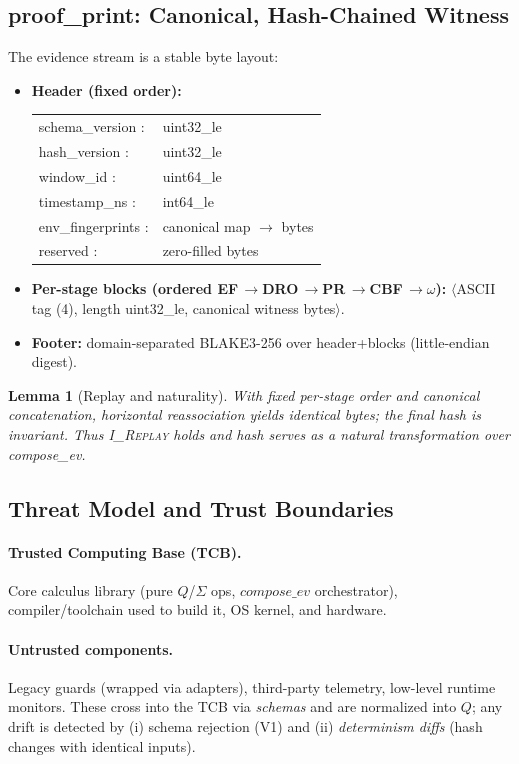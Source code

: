 \documentclass[11pt]{article}
\theoremstyle{plain}
\newtheorem{lemma}[theorem]{Lemma}
\theoremstyle{definition}
\theoremstyle{remark}
\def\Q{Q}%
\def\Sig{\Sigma}%
\def\composeev{compose\_ev}%
\def\code#1{#1}%
\DeclareRobustCommand{\Q}{\texorpdfstring{\ensuremath{\mathcal{Q}}}{Q}}     %
\DeclareRobustCommand{\Sig}{\texorpdfstring{\ensuremath{\Sigma}}{\Sigma}}   %
\DeclareMathOperator{\composeevOp}{compose\_ev}
\DeclareRobustCommand{\composeev}{\texorpdfstring{\ensuremath{\composeevOp}}{compose\_ev}}
\newcommand{\code}[1]{\texttt{\textup{#1}}}    %
\newcommand{\EF}{\textsc{EF}}
\newcommand{\DRO}{\textsc{DRO}}
\newcommand{\PR}{\textsc{PR}}
\newcommand{\CBF}{\textsc{CBF}}
\newcommand{\om}{\ensuremath{\omega}}
\newcommand{\IReplay}{\textsc{I\_Replay}}
\def\Q{Q}%
\def\Sig{\Sigma}%
\def\composeev{compose\_ev}%
\def\code#1{#1}%
\begin{document}
\subsection{\code{proof\_print}: Canonical, Hash-Chained Witness}
The evidence stream is a stable byte layout:
\begin{itemize}[leftmargin=1.6em]
  \item \textbf{Header (fixed order):}
  \begin{tabular}{@{}ll@{}}
  \code{schema\_version} : & \code{uint32\_le} \\
  \code{hash\_version}   : & \code{uint32\_le} \\
  \code{window\_id}      : & \code{uint64\_le} \\
  \code{timestamp\_ns}   : & \code{int64\_le} \\
  \code{env\_fingerprints} : & canonical map $\to$ bytes \\
  \code{reserved}        : & zero-filled bytes \\
  \end{tabular}
  \item \textbf{Per-stage blocks (ordered \EF\,\(\to\)\DRO\,\(\to\)\PR\,\(\to\)\CBF\,\(\to\)\om):} 
  \(\langle\)ASCII tag (4), length \code{uint32\_le}, canonical witness bytes\(\rangle\).
  \item \textbf{Footer:} domain-separated BLAKE3-256 over header+blocks (little-endian digest).
\end{itemize}

\begin{lemma}[Replay and naturality]
With fixed per-stage order and canonical concatenation, horizontal reassociation yields identical bytes; the final hash is invariant. Thus \IReplay{} holds and hash serves as a natural transformation over \composeev.
\end{lemma}

\subsection{Threat Model and Trust Boundaries}
\paragraph{Trusted Computing Base (TCB).} Core calculus library (pure $\Q$/$\Sig$ ops, $\composeev$ orchestrator), compiler/toolchain used to build it, OS kernel, and hardware.

\paragraph{Untrusted components.} Legacy guards (wrapped via adapters), third-party telemetry, low-level runtime monitors. These cross into the TCB via \emph{schemas} and are normalized into $\Q$; any drift is detected by (i) schema rejection (V1) and (ii) \emph{determinism diffs} (hash changes with identical inputs).
\end{document}
